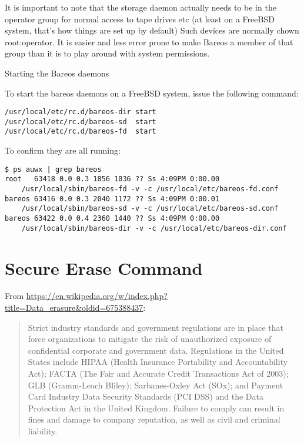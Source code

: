 {It is important to note that the storage daemon actually needs  to be in the
operator group for normal access to tape drives etc (at  least on a FreeBSD
system, that's how things are set up by default)  Such devices are normally
chown root:operator. It is easier and less  error prone  to make Bareos a
member of that group than it is to play around  with system permissions.

Starting the Bareos daemons

To start the bareos daemons on a FreeBSD system, issue the following command:

\footnotesize
\begin{verbatim}
/usr/local/etc/rc.d/bareos-dir start
/usr/local/etc/rc.d/bareos-sd  start
/usr/local/etc/rc.d/bareos-fd  start
\end{verbatim}
\normalsize

To confirm they are all running:

\footnotesize
\begin{verbatim}
$ ps auwx | grep bareos
root   63418 0.0 0.3 1856 1036 ?? Ss 4:09PM 0:00.00
    /usr/local/sbin/bareos-fd -v -c /usr/local/etc/bareos-fd.conf
bareos 63416 0.0 0.3 2040 1172 ?? Ss 4:09PM 0:00.01
    /usr/local/sbin/bareos-sd -v -c /usr/local/etc/bareos-sd.conf
bareos 63422 0.0 0.4 2360 1440 ?? Ss 4:09PM 0:00.00
    /usr/local/sbin/bareos-dir -v -c /usr/local/etc/bareos-dir.conf
\end{verbatim}
\normalsize
}

\section{Secure Erase Command}
\label{sec:SecureEraseCommand}

From \url{https://en.wikipedia.org/w/index.php?title=Data_erasure&oldid=675388437}:
\begin{quote}
    Strict industry standards and government regulations are in place that
    force organizations to mitigate the risk of unauthorized exposure of
    confidential corporate and government data. Regulations in the United
    States include HIPAA (Health Insurance Portability and Accountability
    Act); FACTA (The Fair and Accurate Credit Transactions Act of 2003);
    GLB (Gramm-Leach Bliley); Sarbanes-Oxley Act (SOx); and Payment Card
    Industry Data Security Standards (PCI DSS) and the Data Protection Act
    in the United Kingdom. Failure to comply can result in fines and damage
    to company reputation, as well as civil and criminal liability.
\end{quote}
    
